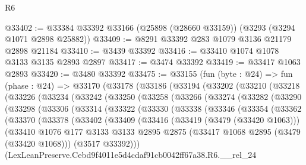 \begin{lexlean}{R6}
\begin{coremodule}
@33402 := @33384 @33392 @33166 (@25898 (@28660 @33159)) (@3293 (@3294 @1071 @2898 @25882))
@33409 := @8291 @33392 @283 @1079 @3136 @21179 @2898 @21184
@33410 := @3439 @33392
@33416 := @33410 @1074 @1078 @3133 @3135 @2893 @2897
@33417 := @3474 @33392
@33419 := @33417 @1063 @2893
@33420 := @3480 @33392
@33475 := @33155
    (fun (byte : @24) =>
    fun (phase : @24) =>
    @33170
      (@33178
        (@33186
          (@33194
            (@33202
              (@33210
                (@33218
                  (@33226
                    (@33234
                      (@33242
                        (@33250
                          (@33258
                            (@33266
                              (@33274
                                (@33282
                                  (@33290
                                    (@33298
                                      (@33306
                                        (@33314
                                          (@33322
                                            (@33330
                                              (@33338
                                                (@33346
                                                  (@33354
                                                    (@33362
                                                      (@33370
                                                        (@33378
                                                          (@33402
                                                            (@33409
                                                              (@33416
                                                                (@33419 (@3479 (@33420 @1063)))
                                                                (@33410
                                                                  @1076
                                                                  @177
                                                                  @3133
                                                                  @3133
                                                                  @2895
                                                                  @2875
                                                                  (@33417
                                                                    @1068
                                                                    @2895
                                                                    (@3479 (@33420 @1068)))
                                                                  (@3517 @33392)))
                                                              (LexLeanPreserve.Cebd9f4011e5d4cdaf91cb0042ff67a38.R6.__rel_24

\end{coremodule}
\end{lexlean}

